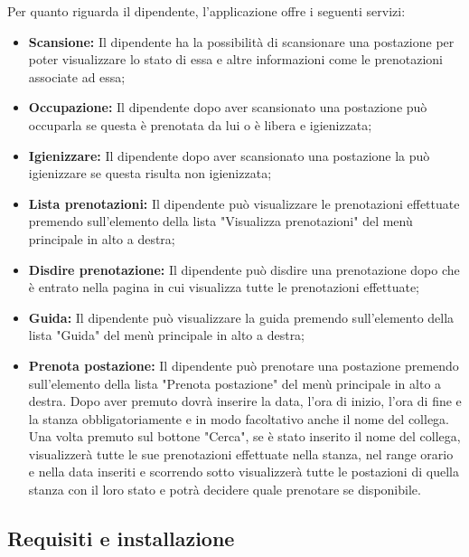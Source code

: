 Per quanto riguarda il dipendente, l'applicazione offre i seguenti servizi:
\begin{itemize}
	\item \textbf{Scansione:} Il dipendente ha la possibilità di scansionare una postazione per poter visualizzare lo stato di essa e altre informazioni come le prenotazioni associate ad essa; \\
	\item \textbf{Occupazione:} Il dipendente dopo aver scansionato una postazione può occuparla se questa è prenotata da lui o è libera e igienizzata; \\
	\item \textbf{Igienizzare:} Il dipendente dopo aver scansionato una postazione la può igienizzare se questa risulta non igienizzata; \\
	\item \textbf{Lista prenotazioni:} Il dipendente può visualizzare le prenotazioni effettuate premendo sull'elemento della lista "Visualizza prenotazioni" del menù principale in alto a destra; \\
	\item \textbf{Disdire prenotazione:} Il dipendente può disdire una prenotazione dopo che è entrato nella pagina in cui visualizza tutte le prenotazioni effettuate; \\
	\item \textbf{Guida:} Il dipendente può visualizzare la guida premendo sull'elemento della lista "Guida" del menù principale in alto a destra; \\
	\item \textbf{Prenota postazione:} Il dipendente può prenotare una postazione premendo sull'elemento della lista "Prenota postazione" del menù principale in alto a destra.
	Dopo aver premuto dovrà inserire la data, l'ora di inizio, l'ora di fine e la stanza obbligatoriamente e in modo facoltativo anche il nome del collega.
	Una volta premuto sul bottone "Cerca", se è stato inserito il nome del collega, visualizzerà tutte le sue prenotazioni effettuate nella stanza, nel range orario e nella data inseriti e scorrendo sotto visualizzerà tutte le postazioni di quella stanza con il loro stato e potrà decidere quale prenotare se disponibile. \\	
\end{itemize}




\subsection{Requisiti e installazione}

